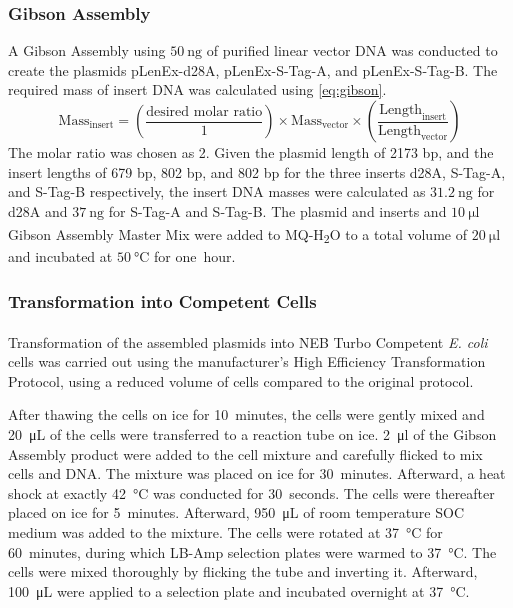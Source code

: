 \subsubsection{Gibson Assembly}
A Gibson Assembly using $\SI{50}{\nano\gram}$ of purified linear vector DNA was conducted to create the plasmids pLenEx-d28A, pLenEx-S-Tag-A, and pLenEx-S-Tag-B. The required mass of insert DNA was calculated using \autoref{eq:gibson}.
\begin{equation}\label{eq:gibson}
\text{Mass}_{\text{insert}} = \left(\frac{\text{desired molar ratio}}{1}\right) \times \text{Mass}_{\text{vector}} \times \left(\frac{\text{Length}_{\text{insert}}}{\text{Length}_{\text{vector}}}\right)
\end{equation}
The molar ratio was chosen as 2. 
Given the plasmid length of 2173 bp, and the insert lengths of 679 bp, 802 bp, and 802 bp for the three inserts d28A, S-Tag-A, and S-Tag-B respectively, the insert DNA masses were calculated as $\SI{31.2}{\nano\gram}$ for d28A and $\SI{37}{\nano\gram}$ for S-Tag-A and S-Tag-B. 
The plasmid and inserts and $\SI{10}{\micro\litre}$ Gibson Assembly\textsuperscript{\textregistered} Master Mix were added to MQ-H\textsubscript{2}O to a total volume of $\SI{20}{\micro\litre}$ and incubated at $\SI{50}{\degreeCelsius}$ for one~hour. 

\subsubsection{Transformation into Competent Cells}
Transformation of the assembled plasmids into NEB\textsuperscript{\textregistered} Turbo Competent \emph{E. coli} cells was carried out using the manufacturer's High Efficiency Transformation Protocol, using a reduced volume of cells compared to the original protocol.

After thawing the cells on ice for 10~minutes, the cells were gently mixed and \SI{20}{\micro\liter} of the cells were transferred to a reaction tube on ice. \SI{2}{\micro\litre} of the Gibson Assembly product were added to the cell mixture and carefully flicked to mix cells and DNA. The mixture was placed on ice for 30~minutes. Afterward, a heat shock at exactly \SI{42}{\celsius} was conducted for 30~seconds. The cells were thereafter placed on ice for 5~minutes. Afterward, \SI{950}{\micro\liter} of room temperature SOC medium was added to the mixture. The cells were rotated at \SI{37}{\celsius} for 60~minutes, during which LB-Amp selection plates were warmed to \SI{37}{\celsius}. The cells were mixed thoroughly by flicking the tube and inverting it. Afterward, \SI{100}{\micro\liter} were applied to a selection plate and incubated overnight at \SI{37}{\celsius}.

